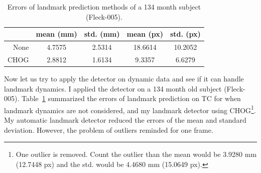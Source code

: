 \begin{table}
  \centering
   \caption{Errors of landmark prediction methods of a 134 month subject (Fleck-005).
   }
  \begin{tabular}{r || cccc}
  & mean (mm) & std. (mm) & mean (px) & std. (px) \\
  \hline
  None & 4.7575 & 2.5314 & 18.6614 & 10.2052 \\
  CHOG & 2.8812 & 1.6134 & 9.3357 & 6.6279 \\
  \end{tabular}
  \label{tab:landmarks}
\end{table}


Now let us try to apply the detector on dynamic data and see if it can handle landmark dynamics.
I applied the detector on a 134 month old subject (Fleck-005).
Table~\ref{tab:landmarks} summarized the errors of landmark prediction on TC for when landmark dynamics are not considered, and my landmark detector using CHOG\footnote{One outlier is removed. Count the outlier than the mean would be 3.9280 mm (12.7448 px) and the std. would be 4.4680 mm (15.0649 px).}.
My automatic landmark detector reduced the errors of the mean and standard deviation.
However, the problem of outliers reminded for one frame.


